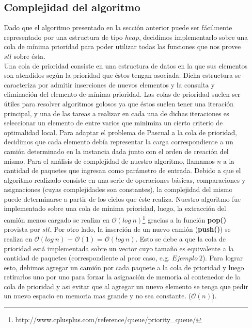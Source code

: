 \subsection{Complejidad del algoritmo}

Dado que el algoritmo presentado en la sección anterior puede ser fácilmente representado por una estructura de tipo $heap$, decidimos implementarlo sobre una cola de mínima prioridad para poder utilizar todas las funciones que nos provee $stl$ sobre ésta.\\

Una cola de prioridad consiste en una estructura de datos en la que sus elementos son atendidos según la prioridad que éstos tengan asociada. Dicha estructura se caracteriza por admitir inserciones de nuevos elementos y la consulta y eliminación del elemento de mínima prioridad.\newline
Las colas de prioridad suelen ser útiles para resolver algoritmos golosos ya que éstos suelen tener una iteración principal, y una de las tareas a realizar en cada una de dichas iteraciones es seleccionar un elemento de entre varios que minimiza un cierto criterio de optimalidad local.\newline
Para adaptar el problema de Pascual a la cola de prioridad, decidimos que cada elemento debía representar la carga correspondiente a un camión determinado en la instancia dada junto con el orden de creación del mismo.\newline
\newline
Para el análisis de complejidad de nuestro algoritmo, llamamos $n$ a la cantidad de paquetes que ingresan como parámetro de entrada.\newline
\newline
Debido a que el algoritmo realizado consiste en una serie de operaciones básicas, comparaciones y asignaciones (cuyas complejidades son constantes), la complejidad del mismo puede determinarse a partir de los ciclos que éste realiza.\newline
\newline
Nuestro algoritmo fue implementado sobre una cola de mínima prioridad, luego, la extracción del camión menos cargado se realiza en $\mathcal{O}(log\ n)$\footnote{http://www.cplusplus.com/reference/queue/priority\_queue/} gracias a la función \textbf{pop()} provista por $stl$.\newline
\newline
Por otro lado, la inserción de un nuevo camión (\textbf{push()}) se realiza en $\mathcal{O}(log\ n)$ + $\mathcal{O}(1)$ = $\mathcal{O}(log\ n)$\footnotemark[1]. Esto se debe a que la cola de prioridad está implementada sobre un vector cuyo tamaño es equivalente a la cantidad de paquetes (correspondiente al peor caso, e.g. $Ejemplo\ 2$). Para lograr esto, debimos agregar un camión por cada paquete a la cola de prioridad y luego retirarlos uno por uno para forzar la asignación de memoria al contenedor de la cola de prioridad y asi evitar que al agregar un nuevo elemento se tenga que pedir un nuevo espacio en memoria mas grande y no sea constante. ($\mathcal{O}(n)$).\newline
